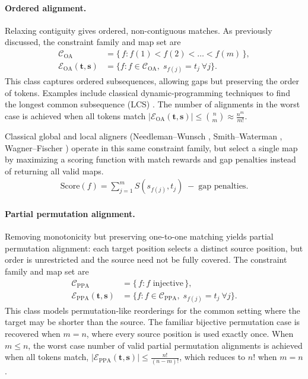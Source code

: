 \paragraph{Ordered alignment.}
Relaxing contiguity gives ordered, non-contiguous matches. As previously discussed, the constraint family and map set are
\begin{align}
\mathcal{C}_{\mathrm{OA}} &= \{\, f : f(1)<f(2)<\dots<f(m) \,\}, \\
\mathcal{E}_{\mathrm{OA}}(\mathbf{t},\mathbf{s}) &= \big\{f : f \in \mathcal{C}_{\mathrm{OA}},\;s_{f(j)} = t_j \ \forall j\big\}.
\end{align}
This class captures ordered subsequences, allowing gaps but preserving the order of tokens. Examples include classical dynamic-programming techniques to find the longest common subsequence (LCS) \citep{hirschberg1975lcs}. The number of alignments in the worst case is achieved when all tokens match $|\mathcal{E}_{\mathrm{OA}}(\mathbf{t},\mathbf{s})| \le \binom{n}{m} \approx \frac{n^m}{m!}$.

Classical global and local aligners (Needleman–Wunsch \citep{needlemanwunsch1970}, Smith–Waterman \citep{smithwaterman1981}, Wagner–Fischer \citep{wagnerfischer1974cost}) operate in this same constraint family, but select a single map by maximizing a scoring function with match rewards and gap penalties instead of returning all valid maps.
\begin{align}
\text{Score}(f)
=
\sum_{j=1}^m S(s_{f(j)},t_j) \;-\; \text{gap penalties}.
\end{align}

\paragraph{Partial permutation alignment.}
Removing monotonicity but preserving one-to-one matching yields partial permutation alignment: each target position selects a distinct source position, but order is unrestricted and the source need not be fully covered. The constraint family and map set are
\begin{align}
\mathcal{C}_{\mathrm{PPA}}
&=
\{\, f : f \text{ injective} \,\}, \\
\mathcal{E}_{\mathrm{PPA}}(\mathbf{t},\mathbf{s})
&=
\big\{
f : f \in \mathcal{C}_{\mathrm{PPA}},\;
s_{f(j)} = t_j \ \forall j
\big\}.
\end{align}
This class models permutation-like reorderings for the common setting where the target may be shorter than the source. The familiar bijective permutation case is recovered when $m=n$, where every source position is used exactly once. When $m\le n$, the worst case number of valid partial permutation alignments is achieved when all tokens match, $|\mathcal{E}_{\mathrm{PPA}}(\mathbf{t},\mathbf{s})| \le \frac{n!}{(n-m)!}$, which reduces to $n!$ when $m=n$.

